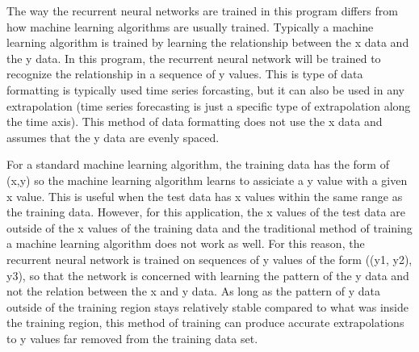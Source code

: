 \documentclass[%
oneside,                 %
final,                   %
10pt]{article}
\begin{document}
The way the recurrent neural networks are trained in this program
differs from how machine learning algorithms are usually trained.
Typically a machine learning algorithm is trained by learning the
relationship between the x data and the y data.  In this program, the
recurrent neural network will be trained to recognize the relationship
in a sequence of y values.  This is type of data formatting is
typically used time series forcasting, but it can also be used in any
extrapolation (time series forecasting is just a specific type of
extrapolation along the time axis).  This method of data formatting
does not use the x data and assumes that the y data are evenly spaced.

For a standard machine learning algorithm, the training data has the
form of (x,y) so the machine learning algorithm learns to assiciate a
y value with a given x value.  This is useful when the test data has x
values within the same range as the training data.  However, for this
application, the x values of the test data are outside of the x values
of the training data and the traditional method of training a machine
learning algorithm does not work as well.  For this reason, the
recurrent neural network is trained on sequences of y values of the
form ((y1, y2), y3), so that the network is concerned with learning
the pattern of the y data and not the relation between the x and y
data.  As long as the pattern of y data outside of the training region
stays relatively stable compared to what was inside the training
region, this method of training can produce accurate extrapolations to
y values far removed from the training data set.
\end{document}
